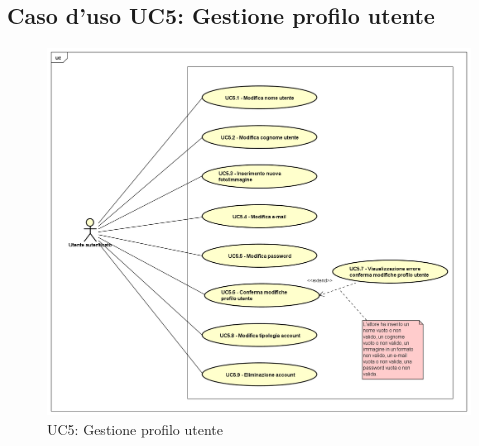 \newpage
\subsection{Caso d'uso UC5: Gestione profilo utente}

\label{UC5}
\begin{figure}[ht]
	\centering
	\includegraphics[scale=0.5,keepaspectratio]{UML/UC5.png}
	\caption{UC5: Gestione profilo utente}
\end{figure}
\FloatBarrier
